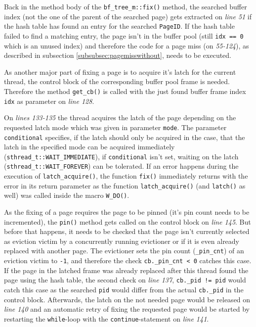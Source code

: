 	Back in the method body of the \lstinline{bf_tree_m::fix()} method, the searched buffer index (not the one of the parent of the searched page) gets extracted on \emph{line 51} if the hash table has found an entry for the searched \lstinline{PageID}. If the hash table failed to find a matching entry, the page isn't in the buffer pool (still \lstinline{idx == 0} which is an unused index) and therefore the code for a page miss (on \emph{55-124}), as described in subsection \ref{subsubsec:pagemisswithout}, needs to be executed.
	
	As another major part of fixing a page is to acquire it's latch for the current thread, the control block of the corresponding buffer pool frame is needed. Therefore the method \lstinline{get_cb()} is called with the just found buffer frame index \lstinline{idx} as parameter on \emph{line 128}.
	
	On \emph{lines 133-135} the thread acquires the latch of the page depending on the requested latch mode which was given in parameter \lstinline{mode}. The parameter \lstinline{conditional} specifies, if the latch should only be acquired in the case, that the latch in the specified mode can be acquired immediately (\lstinline{sthread_t::WAIT_IMMEDIATE}), if \lstinline{conditional} isn't set, waiting on the latch (\lstinline{sthread_t::WAIT_FOREVER}) can be tolerated. If an error happens during the execution of \lstinline{latch_acquire()}, the function \lstinline{fix()} immediately returns with the error in its return parameter as the function \lstinline{latch_acquire()} (and \lstinline{latch()} as well) was called inside the macro \lstinline{W_DO()}.
	
	As the fixing of a page requires the page to be pinned (it's pin count needs to be incremented), the \lstinline{pin()} method gets called on the control block on \emph{line 145}. But before that happens, it needs to be checked that the page isn't currently selected as eviction victim by a concurrently running evictioner or if it is even already replaced with another page. The evictioner sets the pin count (\lstinline{_pin_cnt}) of an eviction victim to \lstinline{-1}, and therefore the check \lstinline{cb._pin_cnt < 0} catches this case. If the page in the latched frame was already replaced after this thread found the page using the hash table, the second check on \emph{line 137}, \lstinline{cb._pid != pid} would catch this case as the searched \lstinline{pid} would differ from the actual \lstinline{cb._pid} in the control block. Afterwards, the latch on the not needed page would be released on \emph{line 140} and an automatic retry of fixing the requested page would be started by restarting the \lstinline{while}-loop with the \lstinline{continue}-statement on \emph{line 141}.
	
